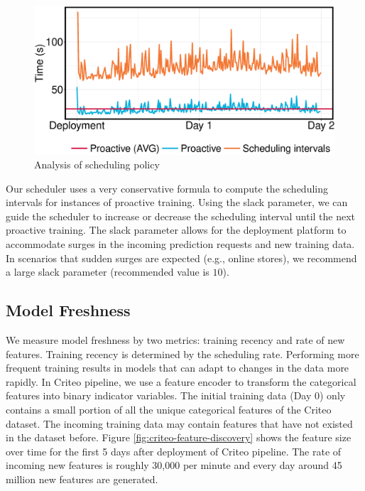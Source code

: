 \begin{figure}[h!]
\centering
\includegraphics[width=\columnwidth]{../images/experiment-results/criteo-scheduling-experiment.eps}
\caption{Analysis of scheduling policy}
\label{fig:scheduling-policy-time}
\vspace{2mm}
\end{figure}

Our scheduler uses a very conservative formula to compute the scheduling intervals for instances of proactive training.
Using the slack parameter, we can guide the scheduler to increase or decrease the scheduling interval until the next proactive training.
The slack parameter allows for the deployment platform to accommodate surges in the incoming prediction requests and new training data.
In scenarios that sudden surges are expected (e.g., online stores), we recommend a large slack parameter (recommended value is $10$). 


\subsection{Model Freshness}\label{subsec:model-freshness}
We measure model freshness by two metrics: training recency and rate of new features.
Training recency is determined by the scheduling rate.
Performing more frequent training results in models that can adapt to changes in the data more rapidly.
In Criteo pipeline, we use a feature encoder to transform the categorical features into binary indicator variables.
The initial training data (Day 0) only contains a small portion of all the unique categorical features of the Criteo dataset.
The incoming training data may contain features that have not existed in the dataset before.
Figure \ref{fig:criteo-feature-discovery} shows the feature size over time for the first 5 days after deployment of Criteo pipeline.
The rate of incoming new features is roughly 30,000 per minute and every day around 45 million new features are generated.

